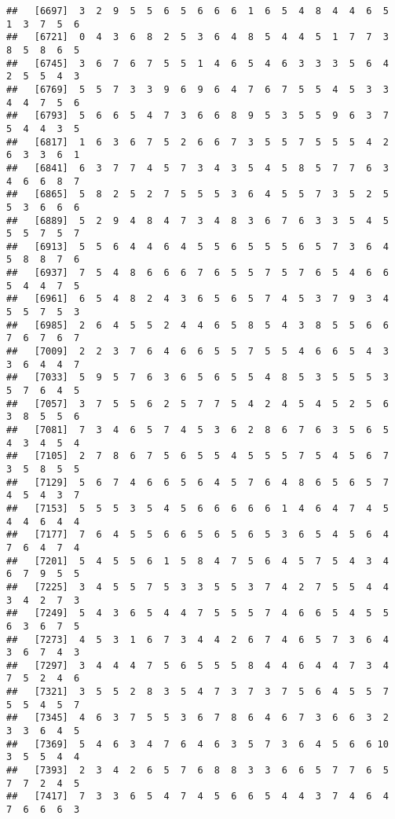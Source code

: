 \documentclass[
]{book}
\begin{document}
\begin{verbatim}
##   [6697]  3  2  9  5  5  6  5  6  6  6  1  6  5  4  8  4  4  6  5  1  3  7  5  6
##   [6721]  0  4  3  6  8  2  5  3  6  4  8  5  4  4  5  1  7  7  3  8  5  8  6  5
##   [6745]  3  6  7  6  7  5  5  1  4  6  5  4  6  3  3  3  5  6  4  2  5  5  4  3
##   [6769]  5  5  7  3  3  9  6  9  6  4  7  6  7  5  5  4  5  3  3  4  4  7  5  6
##   [6793]  5  6  6  5  4  7  3  6  6  8  9  5  3  5  5  9  6  3  7  5  4  4  3  5
##   [6817]  1  6  3  6  7  5  2  6  6  7  3  5  5  7  5  5  5  4  2  6  3  3  6  1
##   [6841]  6  3  7  7  4  5  7  3  4  3  5  4  5  8  5  7  7  6  3  4  6  6  8  7
##   [6865]  5  8  2  5  2  7  5  5  5  3  6  4  5  5  7  3  5  2  5  5  3  6  6  6
##   [6889]  5  2  9  4  8  4  7  3  4  8  3  6  7  6  3  3  5  4  5  5  5  7  5  7
##   [6913]  5  5  6  4  4  6  4  5  5  6  5  5  5  6  5  7  3  6  4  5  8  8  7  6
##   [6937]  7  5  4  8  6  6  6  7  6  5  5  7  5  7  6  5  4  6  6  5  4  4  7  5
##   [6961]  6  5  4  8  2  4  3  6  5  6  5  7  4  5  3  7  9  3  4  5  5  7  5  3
##   [6985]  2  6  4  5  5  2  4  4  6  5  8  5  4  3  8  5  5  6  6  7  6  7  6  7
##   [7009]  2  2  3  7  6  4  6  6  5  5  7  5  5  4  6  6  5  4  3  3  6  4  4  7
##   [7033]  5  9  5  7  6  3  6  5  6  5  5  4  8  5  3  5  5  5  3  5  7  6  4  5
##   [7057]  3  7  5  5  6  2  5  7  7  5  4  2  4  5  4  5  2  5  6  3  8  5  5  6
##   [7081]  7  3  4  6  5  7  4  5  3  6  2  8  6  7  6  3  5  6  5  4  3  4  5  4
##   [7105]  2  7  8  6  7  5  6  5  5  4  5  5  5  7  5  4  5  6  7  3  5  8  5  5
##   [7129]  5  6  7  4  6  6  5  6  4  5  7  6  4  8  6  5  6  5  7  4  5  4  3  7
##   [7153]  5  5  5  3  5  4  5  6  6  6  6  6  1  4  6  4  7  4  5  4  4  6  4  4
##   [7177]  7  6  4  5  5  6  6  5  6  5  6  5  3  6  5  4  5  6  4  7  6  4  7  4
##   [7201]  5  4  5  5  6  1  5  8  4  7  5  6  4  5  7  5  4  3  4  6  7  9  5  5
##   [7225]  3  4  5  5  7  5  3  3  5  5  3  7  4  2  7  5  5  4  4  3  4  2  7  3
##   [7249]  5  4  3  6  5  4  4  7  5  5  5  7  4  6  6  5  4  5  5  6  3  6  7  5
##   [7273]  4  5  3  1  6  7  3  4  4  2  6  7  4  6  5  7  3  6  4  3  6  7  4  3
##   [7297]  3  4  4  4  7  5  6  5  5  5  8  4  4  6  4  4  7  3  4  7  5  2  4  6
##   [7321]  3  5  5  2  8  3  5  4  7  3  7  3  7  5  6  4  5  5  7  5  5  4  5  7
##   [7345]  4  6  3  7  5  5  3  6  7  8  6  4  6  7  3  6  6  3  2  3  3  6  4  5
##   [7369]  5  4  6  3  4  7  6  4  6  3  5  7  3  6  4  5  6  6 10  3  5  5  4  4
##   [7393]  2  3  4  2  6  5  7  6  8  8  3  3  6  6  5  7  7  6  5  7  7  2  4  5
##   [7417]  7  3  3  6  5  4  7  4  5  6  6  5  4  4  3  7  4  6  4  7  6  6  6  3

\end{verbatim}
\end{document}

